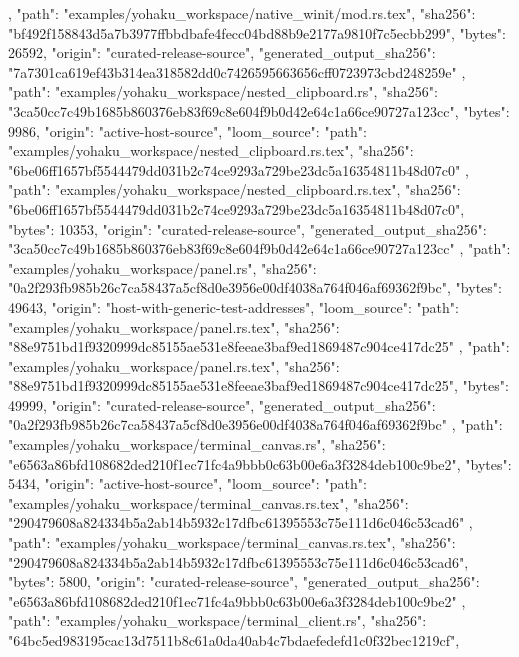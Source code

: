 {{{      }
    },
    {
      "path": "examples/yohaku_workspace/native_winit/mod.rs.tex",
      "sha256": "bf492f158843d5a7b3977ffbbdbafe4fecc04bd88b9e2177a9810f7c5ecbb299",
      "bytes": 26592,
      "origin": "curated-release-source",
      "generated_output_sha256": "7a7301ca619ef43b314ea318582dd0c7426595663656cff0723973cbd248259e"
    },
    {
      "path": "examples/yohaku_workspace/nested_clipboard.rs",
      "sha256": "3ca50cc7c49b1685b860376eb83f69c8e604f9b0d42e64c1a66ce90727a123cc",
      "bytes": 9986,
      "origin": "active-host-source",
      "loom_source": {
        "path": "examples/yohaku_workspace/nested_clipboard.rs.tex",
        "sha256": "6be06ff1657bf5544479dd031b2c74ce9293a729be23dc5a16354811b48d07c0"
      }
    },
    {
      "path": "examples/yohaku_workspace/nested_clipboard.rs.tex",
      "sha256": "6be06ff1657bf5544479dd031b2c74ce9293a729be23dc5a16354811b48d07c0",
      "bytes": 10353,
      "origin": "curated-release-source",
      "generated_output_sha256": "3ca50cc7c49b1685b860376eb83f69c8e604f9b0d42e64c1a66ce90727a123cc"
    },
    {
      "path": "examples/yohaku_workspace/panel.rs",
      "sha256": "0a2f293fb985b26c7ca58437a5cf8d0e3956e00df4038a764f046af69362f9bc",
      "bytes": 49643,
      "origin": "host-with-generic-test-addresses",
      "loom_source": {
        "path": "examples/yohaku_workspace/panel.rs.tex",
        "sha256": "88e9751bd1f9320999dc85155ae531e8feeae3baf9ed1869487c904ce417dc25"
      }
    },
    {
      "path": "examples/yohaku_workspace/panel.rs.tex",
      "sha256": "88e9751bd1f9320999dc85155ae531e8feeae3baf9ed1869487c904ce417dc25",
      "bytes": 49999,
      "origin": "curated-release-source",
      "generated_output_sha256": "0a2f293fb985b26c7ca58437a5cf8d0e3956e00df4038a764f046af69362f9bc"
    },
    {
      "path": "examples/yohaku_workspace/terminal_canvas.rs",
      "sha256": "e6563a86bfd108682ded210f1ec71fc4a9bbb0c63b00e6a3f3284deb100c9be2",
      "bytes": 5434,
      "origin": "active-host-source",
      "loom_source": {
        "path": "examples/yohaku_workspace/terminal_canvas.rs.tex",
        "sha256": "290479608a824334b5a2ab14b5932c17dfbc61395553c75e111d6c046c53cad6"
      }
    },
    {
      "path": "examples/yohaku_workspace/terminal_canvas.rs.tex",
      "sha256": "290479608a824334b5a2ab14b5932c17dfbc61395553c75e111d6c046c53cad6",
      "bytes": 5800,
      "origin": "curated-release-source",
      "generated_output_sha256": "e6563a86bfd108682ded210f1ec71fc4a9bbb0c63b00e6a3f3284deb100c9be2"
    },
    {
      "path": "examples/yohaku_workspace/terminal_client.rs",
      "sha256": "64bc5ed983195cac13d7511b8c61a0da40ab4c7bdaefedefd1c0f32bec1219cf",
}}
